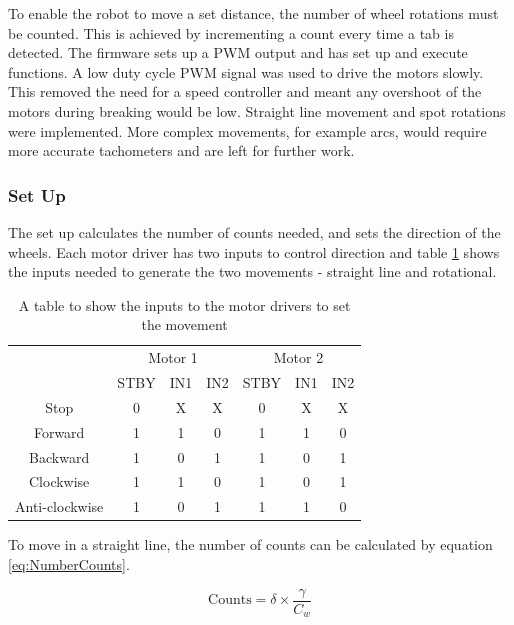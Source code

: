 To enable the robot to move a set distance, the number of wheel rotations must be counted. This is achieved by incrementing a count every time a tab is detected. The firmware sets up a PWM output and has set up and execute functions. A low duty cycle PWM signal was used to drive the motors slowly. This removed the need for a speed controller and meant any overshoot of the motors during breaking would be low. Straight line movement and spot rotations were implemented. More complex movements, for example arcs, would require more accurate tachometers and are left for further work. %

\subsubsection{Set Up}
The set up calculates the number of counts needed, and sets the direction of the wheels. Each motor driver has two inputs to control direction and table \ref{table:MotorDirection} shows the inputs needed to generate the two movements - straight line and rotational. 

\begin{table}
\centering
\caption{A table to show the inputs to the motor drivers to set the movement}
\label{table:MotorDirection}
\begin{tabular}{ccccccc}\toprule
\multicolumn{1}{c}{ }&\multicolumn{3}{c}{Motor 1}&\multicolumn{3}{c}{Motor 2}\\ \cmidrule(r){2-4} \cmidrule(l){5-7}
\multicolumn{1}{c}{ }	&	STBY 	&	IN1	& IN2 	& STBY 	& IN1 	& IN2	\\ \toprule
Stop					&	0		&	X	&	X	&	0	&	X	&	X	\\ \midrule
Forward					&	1		&	1	&	0	&	1	&	1	&	0	\\ \midrule
Backward				&	1		&	0	&	1	&	1	&	0	&	1	\\ \midrule
Clockwise				&	1		&	1	&	0	&	1	&	0	&	1	\\ \midrule
Anti-clockwise 			&	1		&	0	&	1	&	1	&	1	&	0	\\\bottomrule
\end{tabular}

\end{table}

To move in a straight line, the number of counts can be calculated by equation \eqref{eq:NumberCounts}. 

\begin{equation}
\label{eq:NumberCounts}
\text{Counts} = \delta \times \frac{\gamma}{C_w}
\end{equation}

